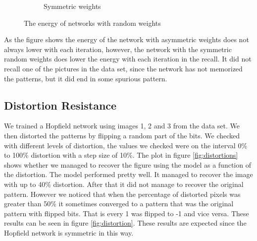 \documentclass[a4paper]{article}
\begin{document}
\begin{figure}[!htb]
\begin{subfigure}[b]{0.48\textwidth}
        \caption{Symmetric weights}
        \label{fig:symmetric}
    \end{subfigure}
    \caption{The energy of networks with random weights}
    \label{fig:energies-random-weights}
\end{figure}

As the figure shows the energy of the network with asymmetric weights does not always lower with each iteration, however, the network with the symmetric random weights does lower the energy with each iteration in the recall. It did not recall one of the pictures in the data set, since the network has not memorized the patterns, but it did end in some spurious pattern.

\subsection{Distortion Resistance}
We trained a Hopfield network using images 1, 2 and 3 from the data set. We then distorted the patterns by flipping a random part of the bits. We checked with different levels of distortion, the values we checked were on the interval 0\% to 100\% distortion with a step size of 10\%. The plot in figure \ref{fig:distortions} shows whether we managed to recover the figure using the model as a function of the distortion. The model performed pretty well. It managed to recover the image with up to 40\% distortion. After that it did not manage to recover the original pattern. However we noticed that when the percentage of distorted pixels was greater than 50\% it sometimes converged to a pattern that was the original pattern with flipped bits. That is every 1 was flipped to -1 and vice versa. These results can be seen in figure \ref{fig:distortion}. These results are expected since the Hopfield network is symmetric in this way.
\end{document}
